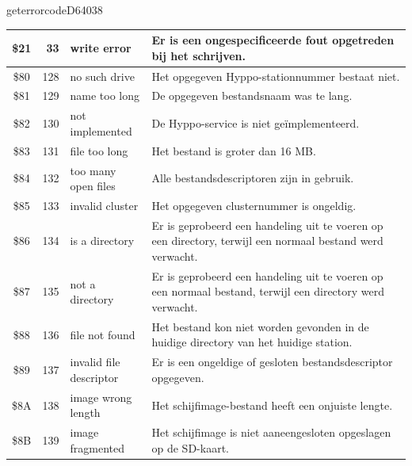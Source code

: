 \begin{hyppotrap}{geterrorcode}{D640}{38}
{\begin{longtable}{|c|r|l|p{8cm}|}
    \\\hline
    \index{Hyppo-foutcodes!\$21}
    \$21 & 33 & write error &    Er is een ongespecificeerde fout opgetreden bij het schrijven.
    \\\hline
    \index{Hyppo-foutcodes!\$80}
    \$80 & 128 & no such drive &    Het opgegeven Hyppo-stationnummer bestaat niet.
    \\\hline
    \index{Hyppo-foutcodes!\$81}
    \$81 & 129 & {name too long} &    De opgegeven bestandsnaam was te lang.
    \\\hline
    \index{Hyppo-foutcodes!\$82}
    \$82 & 130 & not implemented &    De Hyppo-service is niet geïmplementeerd.
    \\\hline
    \index{Hyppo-foutcodes!\$83}
    \$83 & 131 & file too long &    Het bestand is groter dan 16 MB.
    \\\hline
    \index{Hyppo-foutcodes!\$84}
    \$84 & 132 & \makecell[tl]{too many\\open files} &    Alle bestandsdescriptoren zijn in gebruik.
    \\\hline
    \index{Hyppo-foutcodes!\$85}
    \$85 & 133 & invalid cluster &    Het opgegeven clusternummer is ongeldig.
    \\\hline
    \index{Hyppo-foutcodes!\$86}
    \$86 & 134 & is a directory &    Er is geprobeerd een handeling uit te voeren op een directory, terwijl een normaal bestand werd verwacht.
    \\\hline
    \index{Hyppo-foutcodes!\$87}
    \$87 & 135 & not a directory &    Er is geprobeerd een handeling uit te voeren op een normaal bestand, terwijl een directory werd verwacht.
    \\\hline
    \index{Hyppo-foutcodes!\$88}
    \$88 & 136 & file not found &    Het bestand kon niet worden gevonden in de huidige directory van het huidige station.
    \\\hline
    \index{Hyppo-foutcodes!\$89}
    \$89 & 137 & \makecell[tl]{invalid file\\descriptor} &    Er is een ongeldige of gesloten bestandsdescriptor opgegeven.
    \\\hline
    \index{Hyppo-foutcodes!\$8A}
    \$8A & 138 & \makecell[tl]{image wrong\\length} &    Het schijfimage-bestand heeft een onjuiste lengte.
    \\\hline
    \index{Hyppo-foutcodes!\$8B}
    \$8B & 139 & image fragmented &    Het schijfimage is niet aaneengesloten opgeslagen op de SD-kaart.
    \\\hline

\end{longtable}}
\end{hyppotrap}
